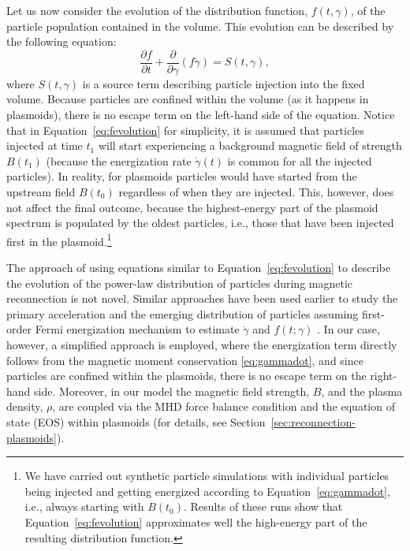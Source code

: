 Let us now consider the evolution of the distribution function, $f(t,\gamma)$, of the particle population contained in the volume. This evolution can be described by the following equation:
\begin{equation}
    \label{eq:fevolution}
    \frac{\partial f}{\partial t} + \frac{\partial}{\partial \gamma}\left(f\dot{\gamma}\right)=S(t,\gamma),
\end{equation}
where $S(t,\gamma)$ is a source term describing particle injection into the fixed volume. Because particles are confined within the volume (as it happens in plasmoids), there is no escape term on the left-hand side of the equation. Notice that in Equation~\eqref{eq:fevolution} for simplicity, it is assumed that particles injected at time $t_1$ will start experiencing a background magnetic field of strength $B(t_1)$ (because the energization rate $\dot{\gamma}(t)$ is common for all the injected particles). In reality, for plasmoids particles would have started from the upstream field $B(t_0)$ regardless of when they are injected. This, however, does not affect the final outcome, because the highest-energy part of the plasmoid spectrum is populated by the oldest particles, i.e., those that have been injected first in the plasmoid.\footnote{We have carried out synthetic particle simulations with individual particles being injected and getting energized according to Equation~\eqref{eq:gammadot}, i.e., always starting with $B(t_0)$. Results of these runs show that Equation~\eqref{eq:fevolution} approximates well the high-energy part of the resulting distribution function.}

The approach of using equations similar to Equation~\eqref{eq:fevolution} to describe the evolution of the power-law distribution of particles during magnetic reconnection is not novel. Similar approaches have been used earlier to study the primary acceleration and the emerging distribution of particles assuming first-order Fermi energization mechanism to estimate $\dot{\gamma}$ and $f(t;\gamma)$ \citep[see, e.g.,][]{2012MNRAS.422.2474D, 2014PhRvL.113o5005G, 2017PhPl...24f2906M, 2019ApJ...879L..23G}. In our case, however, a simplified approach is employed, where the energization term directly follows from the magnetic moment conservation \eqref{eq:gammadot}, and since particles are confined within the plasmoids, there is no escape term on the right-hand side. Moreover, in our model the magnetic field strength, $B$, and the plasma density, $\rho$,  are coupled via the MHD force balance condition and the equation of state (EOS) within plasmoids (for details, see Section~\ref{sec:reconnection-plasmoids}).

